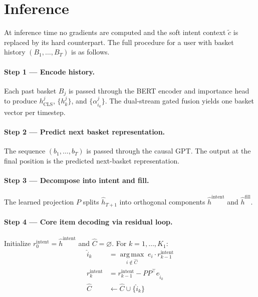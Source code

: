 \documentclass[conference]{IEEEtran}
\begin{document}
\section{Inference}
\label{sec:inference}

At inference time no gradients are computed and the soft intent context
$\tilde{c}$ is replaced by its hard counterpart. The full procedure
for a user with basket history $(B_1, \ldots, B_T)$ is as follows.

\paragraph{Step 1 --- Encode history.}
Each past basket $B_j$ is passed through the BERT encoder and
importance head to produce $h_{\text{CLS}}^j$, $\{h_k^j\}$, and
$\{\alpha_{i_k}^j\}$. The dual-stream gated fusion yields one
basket vector per timestep.

\paragraph{Step 2 --- Predict next basket representation.}
The sequence $(b_1, \ldots, b_T)$ is passed through the causal GPT.
The output at the final position is the predicted next-basket
representation.

\paragraph{Step 3 --- Decompose into intent and fill.}
The learned projection $P$ splits $\hat{h}_{T+1}$ into orthogonal
components $\hat{h}^{\text{intent}}$ and $\hat{h}^{\text{fill}}$.

\paragraph{Step 4 --- Core item decoding via residual loop.}
Initialize $r_0^{\text{intent}} = \hat{h}^{\text{intent}}$ and
$\hat{C} = \varnothing$. For $k = 1, \ldots, K_1$:
\begin{align}
\hat{i}_k &= \operatorname*{arg\,max}_{i \notin \hat{C}}\;
             e_i \cdot r_{k-1}^{\text{intent}} \\
r_k^{\text{intent}} &= r_{k-1}^{\text{intent}} - PP^\top e_{\hat{i}_k} \\
\hat{C} &\leftarrow \hat{C} \cup \{\hat{i}_k\}
\end{align}
\end{document}
